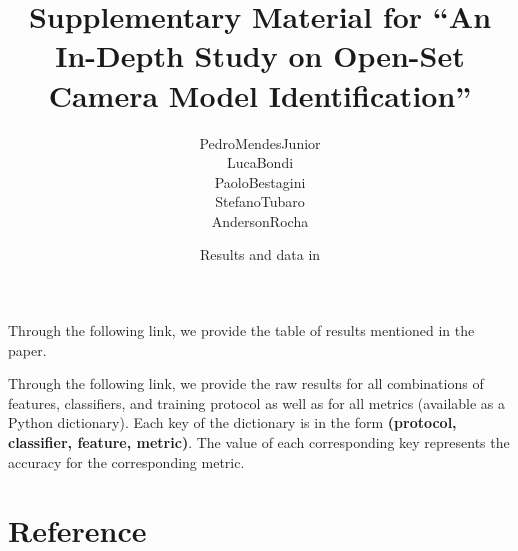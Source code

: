 

% 

\renewcommand\highlightauthorname[1]{#1}

\title{{Supplementary Material for ``An In-Depth Study on Open-Set Camera Model Identification''}}
\author{\gls{PedroMendesJunior}\\%
  \gls{LucaBondi}\\%
  \gls{PaoloBestagini}\\%
  \gls{StefanoTubaro}\\%
  \gls{AndersonRocha}\\%
}
\date{Results and data in }



\maketitle


Through the following link, we provide the table of results mentioned in the paper.

\begin{center}
\end{center}

Through the following link, we provide the raw results for all combinations of features, classifiers, and training protocol as well as for all metrics (available as a Python dictionary).
Each key of the dictionary is in the form \textbf{(protocol, classifier, feature, metric)}. The value of each corresponding key represents the accuracy for the corresponding metric.

\begin{center}
\end{center}

\section*{Reference}

\begin{publications}
  \\

\end{publications}





